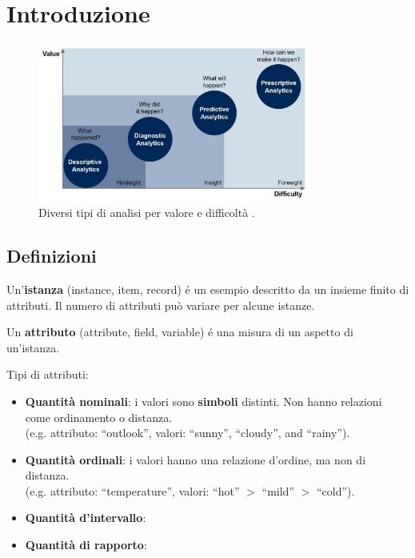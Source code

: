\chapter{Introduzione}


\begin{figure}[ht]
  \centering
  \includegraphics[width=0.8\textwidth]{images/GartnerFourAnalyticTypesV5-1024x593.jpg}
  \caption{Diversi tipi di analisi per valore e difficoltà \cite{web:GartnerFourAnalyticTypesV5}.}
\end{figure}

\pagebreak

\section{Definizioni}

Un'\textbf{istanza} (instance, item, record) é un esempio descritto da un insieme finito di attributi.
Il numero di attributi può variare per alcune istanze.

Un \textbf{attributo} (attribute, field, variable) é una misura di un aspetto
di un'istanza.

Tipi di attributi:
\begin{itemize}
  \item \textbf{Quantità nominali}: i valori sono \textbf{simboli} distinti. Non hanno relazioni come ordinamento o distanza.\\(e.g. attributo: ``outlook'', valori: ``sunny”, ``cloudy'', and ``rainy'').
  \item \textbf{Quantità ordinali}: i valori hanno una relazione d'ordine, ma non di distanza.\\(e.g. attributo: ``temperature'', valori: ``hot'' $>$ ``mild'' $>$ ``cold'').
  \item \textbf{Quantità d'intervallo}: 
  \item \textbf{Quantità di rapporto}: 
\end{itemize}

